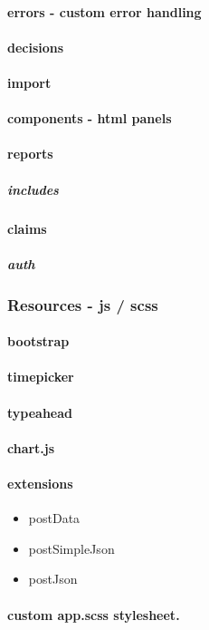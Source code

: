 	\paragraph{errors - custom error handling}
	\paragraph{decisions}
	\paragraph{import}
	\paragraph{components - html panels}
	\paragraph{reports}
		\subparagraph{includes}
	\paragraph{claims}
		\subparagraph{auth}
	\subsubsection{Resources - js / scss}
	\paragraph{bootstrap}
	\paragraph{timepicker}
	\paragraph{typeahead}
	\paragraph{chart.js}
	\paragraph{extensions}
			\begin{itemize}
				\item postData
				\item postSimpleJson
				\item postJson
			\end{itemize}
	\paragraph{custom app.scss stylesheet.}